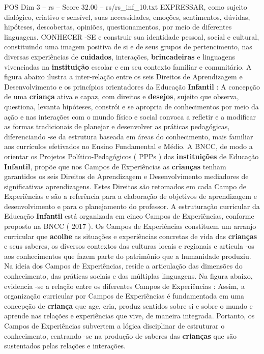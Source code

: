 \begin{textsample}{POS Dim 3 – rs – Score 32.00 – rs/rs\_inf\_10.txt}
EXPRESSAR, como sujeito dialógico, criativo e sensível, suas necessidades, emoções, sentimentos, dúvidas, hipóteses, descobertas, opiniões, questionamentos, por meio de diferentes linguagens.
CONHECER -SE e construir sua identidade pessoal, social e cultural, constituindo uma imagem positiva de si e de seus grupos de pertencimento, nas diversas experiências de \textbf{cuidados}, interações, \textbf{brincadeiras} e linguagens vivenciadas na \textbf{instituição} escolar e em seu contexto familiar e comunitário.
A figura abaixo ilustra a inter-relação entre os seis Direitos de Aprendizagem e Desenvolvimento e os princípios orientadores da Educação \textbf{Infantil} : A concepção de uma \textbf{criança} ativa e capaz, com direitos e \textbf{desejos}, sujeito que observa, questiona, levanta hipóteses, constrói e se apropria de conhecimentos por meio da ação e nas interações com o mundo físico e social convoca a refletir e a modificar as formas tradicionais de planejar e desenvolver as práticas pedagógicas, diferenciando -se da estrutura baseada em áreas do conhecimento, mais familiar aos currículos efetivados no Ensino Fundamental e Médio.
A BNCC, de modo a orientar os Projetos Político-Pedagógicos ( PPPs ) das \textbf{instituições} de Educação \textbf{Infantil}, propõe que nos Campos de Experiências as \textbf{crianças} tenham garantidos os seis Direitos de Aprendizagem e Desenvolvimento mediadores de significativas aprendizagens.
Estes Direitos são retomados em cada Campo de Experiências e são a referência para a elaboração de objetivos de aprendizagem e desenvolvimento e para o planejamento do professor.
A estruturação curricular da Educação \textbf{Infantil} está organizada em cinco Campos de Experiências, conforme proposto na BNCC ( 2017 ).
Os Campos de Experiências constituem um arranjo curricular que \textbf{acolhe} as situações e experiências concretas de vida das \textbf{crianças} e seus saberes, os diversos contextos das culturas locais e regionais e articula -os aos conhecimentos que fazem parte do patrimônio que a humanidade produziu.
Na ideia dos Campos de Experiências, reside a articulação das dimensões do conhecimento, das práticas sociais e das múltiplas linguagens.
Na figura abaixo, evidencia -se a relação entre os diferentes Campos de Experiências : Assim, a organização curricular por Campos de Experiências é fundamentada em uma concepção de \textbf{criança} que age, cria, produz sentidos sobre si e sobre o mundo e aprende nas relações e experiências que vive, de maneira integrada.
Portanto, os Campos de Experiências subvertem a lógica disciplinar de estruturar o conhecimento, centrando -se na produção de saberes das \textbf{crianças} que são sustentados pelas relações e interações.

\end{textsample}
